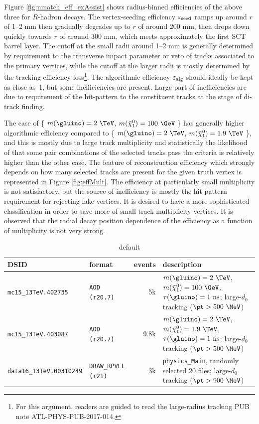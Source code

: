 Figure \ref{fig:nmatch_eff_exAssist} shows radius-binned efficiencies of the above three for $R$-hadron decays. The vertex-seeding efficiency $\varepsilon_{\rm seed}$ ramps up around $r$ of 1--2 mm then gradually degrades up to $r$ of around 200 mm, then drops down quickly towards $r$ of around 300 mm, which meets approximately the first SCT barrel layer. The cutoff at the small radii around 1--2 mm is generally determined by requirement to the transverse impact parameter or veto of tracks associated to the primary vertices, while the cutoff at the larger radii is mostly determined by the tracking efficiency loss\footnote{For this argument, readers are guided to read the large-radius tracking PUB note ATL-PHYS-PUB-2017-014.}. The algorithmic efficiency $\varepsilon_{\rm alg}$ should ideally be kept as close as~1, but some inefficiencies are present. Large part of inefficiencies are due to requirement of the hit-pattern to the constituent tracks at the stage of di-track finding.

The case of \{ $m(\gluino) = 2~\TeV$, $m(\tilde{\chi}_{1}^{0}) = 100~\GeV$ \} has generally higher algorithmic efficiency compared to \{ $m(\gluino) = 2~\TeV$, $m(\tilde{\chi}_{1}^{0}) = 1.9~\TeV$ \}, and this is mostly due to large track multiplicity and statistically the likelihood of that some pair combinations of the selected tracks pass the criteria is relatively higher than the other case. The feature of reconstruction efficiency which strongly depends on how many selected tracks are present for the given truth vertex is represented in Figure \ref{fig:effMult}. The efficiency at particularly small multiplicity is not satisfactory, but the source of inefficiency is mostly the hit pattern requirement for rejecting fake vertices. It is desired to have a more sophisticated classification in order to save more of small track-multiplicity vertices. It is observed that the radial decay position dependence of the efficiency as a function of multiplicity is not very strong.

\begin{table}[tbp]
\caption{default}
\centering
\scriptsize
\begin{tabular}{llrp{9.6cm}}
\hline
\hline
DSID & format & events & description\\
\hline
{\tt mc15\_13TeV.402735}& {\tt AOD (r20.7)} & 5k   & $m(\gluino) = 2~\TeV$, $m(\tilde{\chi}_{1}^{0}) = 100~\GeV$, $\tau(\gluino) = 1~{\rm ns}$; large-$d_{0}$ tracking ($\pt > 500~\MeV$)\\
{\tt mc15\_13TeV.403087}& {\tt AOD (r20.7)} & 9.8k & $m(\gluino) = 2~\TeV$, $m(\tilde{\chi}_{1}^{0}) = 1.9~\TeV$, $\tau(\gluino) = 1~{\rm ns}$; large-$d_{0}$ tracking ($\pt > 500~\MeV$)\\
{\tt data16\_13TeV.00310249} & {\tt DRAW\_RPVLL (r21)} & 3k  & {\tt physics\_Main}, randomly selected 20 files; large-$d_{0}$ tracking ($\pt > 900~\MeV$)\\
\hline
\hline
\end{tabular}
\label{tbl:mc_samples}
\end{table}%

